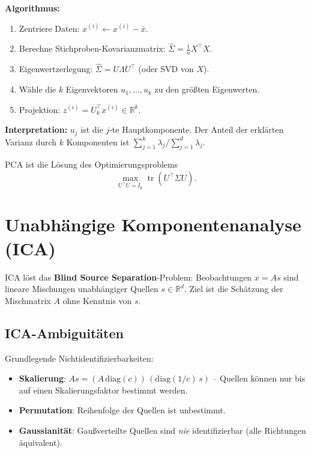 \documentclass[11pt]{article}
\theoremstyle{csthm}
\theoremstyle{csdef}
\newcommand{\R}{\mathbb{R}}
\newcommand{\T}{^\top}
\begin{document}
\textbf{Algorithmus:}
\begin{enumerate}
  \item Zentriere Daten: $x^{(i)} \leftarrow x^{(i)} - \bar x$.
  \item Berechne Stichproben-Kovarianzmatrix: $\hat\Sigma = \frac{1}{n}X\T X$.
  \item Eigenwertzerlegung: $\hat\Sigma = U \Lambda U\T$ (oder SVD von $X$).
  \item Wähle die $k$ Eigenvektoren $u_1,\ldots,u_k$ zu den größten
        Eigenwerten.
  \item Projektion: $z^{(i)} = U_k\T x^{(i)} \in \R^k$.
\end{enumerate}

\textbf{Interpretation:} $u_j$ ist die $j$-te Hauptkomponente.
Der Anteil der erklärten Varianz durch $k$ Komponenten ist
$\sum_{j=1}^k \lambda_j / \sum_{j=1}^d \lambda_j$.

PCA ist die Lösung des Optimierungsproblems
\begin{equation}
  \max_{U\T U = I_k} \operatorname{tr}(U\T \hat\Sigma U).
\end{equation}

\section{Unabhängige Komponentenanalyse (ICA)}

ICA löst das \textbf{Blind Source Separation}-Problem: Beobachtungen
$x = As$ sind lineare Mischungen unabhängiger Quellen $s \in \R^d$.
Ziel ist die Schätzung der Mischmatrix $A$ ohne Kenntnis von $s$.

\subsection{ICA-Ambiguitäten}

Grundlegende Nichtidentifizierbarkeiten:
\begin{itemize}
  \item \textbf{Skalierung}: $As = (A\,\mathrm{diag}(c))\,(\mathrm{diag}(1/c)\,s)$
        -- Quellen können nur bis auf einen Skalierungsfaktor bestimmt werden.
  \item \textbf{Permutation}: Reihenfolge der Quellen ist unbestimmt.
  \item \textbf{Gaussianität}: Gaußverteilte Quellen sind \emph{nie}
        identifizierbar (alle Richtungen äquivalent).
\end{itemize}
\end{document}
